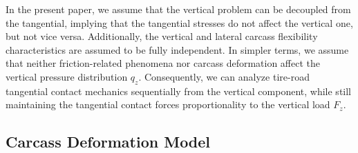 In the present paper, we assume that the vertical problem can be decoupled from the tangential, implying that the tangential stresses do not affect the vertical one, but not vice versa. Additionally, the vertical and lateral carcass flexibility characteristics are assumed to be fully independent. In simpler terms, we assume that neither friction-related phenomena nor carcass deformation affect the vertical pressure distribution $q_z$. Consequently, we can analyze tire-road tangential contact mechanics sequentially from the vertical component, while still maintaining the tangential contact forces proportionality to the vertical load $F_z$.


\subsection{Carcass Deformation Model}
\label{chap4:sec:carcass_model}

